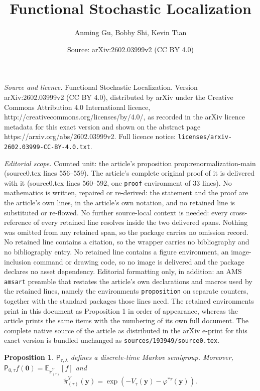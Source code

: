 \documentclass[10pt,a4paper]{amsart}
\title{Functional Stochastic Localization}
\author{Anming Gu, Bobby Shi, Kevin Tian}
\date{Source: arXiv:2602.03999v2 (CC BY 4.0)}
\newtheorem{proposition}{Proposition}
\newcommand{\Par}[1]{\left(#1\right)}
\newcommand{\sfP}{\mathsf{P}}
\newcommand{\tpi}{\tilde{\pi}}
\newcommand{\vy}{\mathbf{y}}
\begin{document}
\maketitle

\noindent\emph{Source and licence.} Functional Stochastic Localization. Version arXiv:2602.03999v2 (CC BY 4.0), distributed by arXiv under the Creative Commons Attribution 4.0 International licence, http://creativecommons.org/licenses/by/4.0/, as recorded in the arXiv licence metadata for this exact version and shown on the abstract page https://arxiv.org/abs/2602.03999v2. Full licence notice: \texttt{licenses/arxiv-2602.03999-CC-BY-4.0.txt}.\par\smallskip

\noindent\textit{Editorial scope.} Counted unit: the article's proposition prop:renormalization-main (source0.tex lines 556--559). The article's complete original proof of it is delivered with it (source0.tex lines 560--592, one \texttt{proof} environment of 33 lines). No mathematics is written, repaired or re-derived: the statement and the proof are the article's own lines, in the article's own notation, and no retained line is substituted or re-flowed.  No further source-local context is needed: every cross-reference of every retained line resolves inside the two delivered spans.  Nothing was omitted from any retained span, so the package carries no omission record.  No retained line contains a citation, so the wrapper carries no bibliography and no bibliography entry.  No retained line contains a figure environment, an image-inclusion command or drawing code, so no image is delivered and the package declares no asset dependency.  Editorial formatting only, in addition: an AMS \texttt{amsart} preamble that restates the article's own declarations and macros used by the retained lines, namely the environments \texttt{proposition} on separate counters, together with the standard packages those lines need.  The retained environments print in this document as Proposition 1 in order of appearance, whereas the article prints the same items with the numbering of its own full document.  The complete native source of the article as distributed in the arXiv e-print for this exact version is bundled unchanged as \texttt{sources/193949/source0.tex}.
\begin{proposition}\label{prop:renormalization-main}
$\sfP_{\tau, \lambda}$ defines a discrete-time Markov semigroup.  Moreover, $\sfP_{0, \tau}f(\mathbf{0})=\mathbb{E}_{\tpi_{(\tau)}^Y}[f]$ and
\[\tpi_{(\tau)}^Y(\vy)=\exp\Par{-V_\tau(\vy)-\varphi^{*\tau}(\vy)}.\]
\end{proposition}
\end{document}
